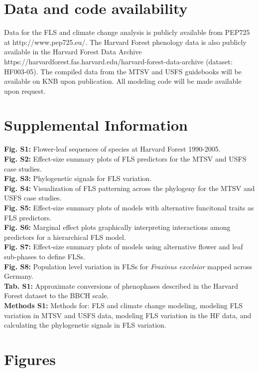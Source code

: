 \documentclass[11pt]{article}
\begin{document}
\section*{Data and code availability}
Data for the FLS and climate change analysis is publicly available from PEP725 at http://www.pep725.eu/. The Harvard Forest phenology data is also publicly available in the Harvard Forest Data Archive https://harvardforest.fas.harvard.edu/harvard-forest-data-archive (dataset: HF003-05). The compiled data from the MTSV and USFS guidebooks will be available on KNB upon publication. All modeling code will be made available upon request. %





\newpage
\section*{Supplemental Information}
\textbf{Fig. S1:} Flower-leaf sequences of species at Harvard Forest 1990-2005.\\
\textbf{Fig. S2:} Effect-size summary plots of FLS predictors for the MTSV and USFS case studies. \\
\textbf{Fig. S3:} Phylogenetic signals for FLS variation.\\
\textbf{Fig. S4:} Visualization of FLS patterning across the phylogeny for the MTSV and USFS case studies.\\
\textbf{Fig. S5:} Effect-size summary plots of models with alternative funcitonal traits as FLS predictors.\\
\textbf{Fig. S6:} Marginal effect plots graphically interpreting interactions among predictors for a hierarchical FLS model.\\
\textbf{Fig. S7:} Effect-size summary plots of models using alternative flower and leaf sub-phases to define FLSs.\\
\textbf{Fig. S8:} Population level variation in FLSs for \emph{Fraxinus excelsior} mapped across Germany.\\
\textbf{Tab. S1:} Approximate conversions of phenophases described in the Harvard Forest dataset to the BBCH scale.\\
\textbf{Methods S1:} Methods for: FLS and climate change modeling, modeling FLS variation in MTSV and USFS data, modeling FLS variation in the HF data, and calculating the phylogenetic signals in FLS variation.
\newpage
\section*{Figures}
\end{document}
